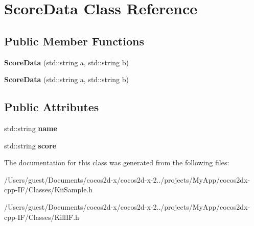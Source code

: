 \hypertarget{class_score_data}{\section{Score\-Data Class Reference}
\label{class_score_data}
}
\subsection*{Public Member Functions}
\begin{DoxyCompactItemize}
\item 
\hypertarget{class_score_data_abf1d66fd77ea596a1f8b17d9029d1c31}{{\bfseries Score\-Data} (std\-::string a, std\-::string b)}\label{class_score_data_abf1d66fd77ea596a1f8b17d9029d1c31}

\item 
\hypertarget{class_score_data_abf1d66fd77ea596a1f8b17d9029d1c31}{{\bfseries Score\-Data} (std\-::string a, std\-::string b)}\label{class_score_data_abf1d66fd77ea596a1f8b17d9029d1c31}

\end{DoxyCompactItemize}
\subsection*{Public Attributes}
\begin{DoxyCompactItemize}
\item 
\hypertarget{class_score_data_a9bff702df3b7ae72e630fc772fd41159}{std\-::string {\bfseries name}}\label{class_score_data_a9bff702df3b7ae72e630fc772fd41159}

\item 
\hypertarget{class_score_data_a5e18382830ff3a4a8d9db51903d22882}{std\-::string {\bfseries score}}\label{class_score_data_a5e18382830ff3a4a8d9db51903d22882}

\end{DoxyCompactItemize}


The documentation for this class was generated from the following files\-:\begin{DoxyCompactItemize}
\item 
/\-Users/guest/\-Documents/cocos2d-\/x/cocos2d-\/x-\/2../projects/\-My\-App/cocos2dx-\/cpp-\/\-I\-F/\-Classes/Kii\-Sample.\-h\item 
/\-Users/guest/\-Documents/cocos2d-\/x/cocos2d-\/x-\/2../projects/\-My\-App/cocos2dx-\/cpp-\/\-I\-F/\-Classes/Kill\-I\-F.\-h\end{DoxyCompactItemize}
